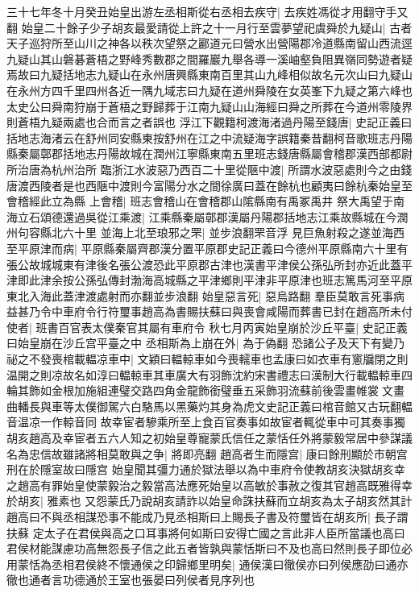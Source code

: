 三十七年冬十月癸丑始皇出游左丞相斯從右丞相去疾守|{
	去疾姓馮從才用翻守手又翻}
始皇二十餘子少子胡亥最愛請從上許之十一月行至雲夢望祀虞舜於九疑山|{
	古者天子巡狩所至山川之神各以秩次望祭之酈道元曰營水出營陽郡冷道縣南留山西流逕九疑山其山磐碁蒼梧之野峰秀數郡之間羅巖九舉各導一溪岫壑負阻異嶺同勢遊者疑焉故曰九疑括地志九疑山在永州唐興縣東南百里其山九峰相似故名元次山曰九疑山在永州方四千里四州各近一隅九域志曰九疑在道州舜陵在女英峯下九疑之第六峰也太史公曰舜南狩崩于蒼梧之野歸葬于江南九疑山山海經曰舜之所葬在今道州零陵界則蒼梧九疑兩處也合而言之者誤也}
浮江下觀籍柯渡海渚過丹陽至錢唐|{
	史記正義曰括地志海渚云在舒州同安縣東按舒州在江之中流疑海字誤籍秦昔翻柯音歌班志丹陽縣秦屬鄣郡括地志丹陽故城在潤州江寧縣東南五里班志錢唐縣屬會稽郡漢西部都尉所治唐為杭州治所}
臨浙江水波惡乃西百二十里從陿中渡|{
	所謂水波惡處則今之由錢唐渡西陵者是也西陿中渡則今富陽分水之間徐廣曰蓋在餘杭也顧夷曰餘杭秦始皇至會稽經此立為縣}
上會稽|{
	班志會稽山在會稽郡山隂縣南有禹冢禹井}
祭大禹望于南海立石頌德還過吳從江乘渡|{
	江乘縣秦屬鄣郡漢屬丹陽郡括地志江乘故縣城在今潤州句容縣北六十里}
並海上北至琅邪之罘|{
	並步浪翻罘音浮}
見巨魚射殺之遂並海西至平原津而病|{
	平原縣秦屬齊郡漢分置平原郡史記正義曰今德州平原縣南六十里有張公故城城東有津後名張公渡恐此平原郡古津也漢書平津侯公孫弘所封亦近此蓋平津即此津余按公孫弘傳封渤海高城縣之平津鄉則平津非平原津也班志篤馬河至平原東北入海此蓋津渡處射而亦翻並步浪翻}
始皇惡言死|{
	惡烏路翻}
羣臣莫敢言死事病益甚乃令中車府令行符璽事趙高為書賜扶蘇曰與喪會咸陽而葬書已封在趙高所未付使者|{
	班書百官表太僕秦官其屬有車府令}
秋七月丙寅始皇崩於沙丘平臺|{
	史記正義曰始皇崩在沙丘宫平臺之中}
丞相斯為上崩在外|{
	為于偽翻}
恐諸公子及天下有變乃祕之不發喪棺載輼凉車中|{
	文穎曰輼輬車如今喪轜車也孟康曰如衣車有窻牖閉之則温開之則凉故名如淳曰輼輬車其車廣大有羽飾沈約宋書禮志曰漢制大行載輼輬車四輪其飾如金根加施組連璧交路四角金龍飾銜璧垂五采飾羽流蘇前後雲畫帷裳文畫曲轓長與車等太僕御駕六白駱馬以黑藥灼其身為虎文史記正義曰棺音館又古玩翻輼音温凉一作輬音同}
故幸宦者驂乘所至上食百官奏事如故宦者輒從車中可其奏事獨胡亥趙高及幸宦者五六人知之初始皇尊寵蒙氏信任之蒙恬任外將蒙毅常居中參謀議名為忠信故雖諸將相莫敢與之争|{
	將即亮翻}
趙高者生而隱宫|{
	康曰餘刑顯於市朝宫刑在於隱室故曰隱宫}
始皇聞其彊力通於獄法舉以為中車府令使教胡亥決獄胡亥幸之趙高有罪始皇使蒙毅治之毅當高法應死始皇以高敏於事赦之復其官趙高既雅得幸於胡亥|{
	雅素也}
又怨蒙氏乃說胡亥請詐以始皇命誅扶蘇而立胡亥為太子胡亥然其計趙高曰不與丞相謀恐事不能成乃見丞相斯曰上賜長子書及符璽皆在胡亥所|{
	長子謂扶蘇}
定太子在君侯與高之口耳事將何如斯曰安得亡國之言此非人臣所當議也高曰君侯材能謀慮功高無怨長子信之此五者皆孰與蒙恬斯曰不及也高曰然則長子即位必用蒙恬為丞相君侯終不懷通侯之印歸鄉里明矣|{
	通侯漢曰徹侯亦曰列侯應劭曰通亦徹也通者言功德通於王室也張晏曰列侯者見序列也}
